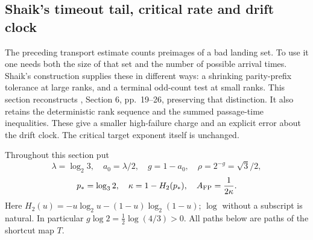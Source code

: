 \subsection{Shaik's timeout tail, critical rate and drift clock}
\label{sec:Shaik-timeout}
The preceding transport estimate counts preimages of a bad landing set.
To use it one needs both the size of that set and the number of possible
arrival times. Shaik's construction supplies these in different ways:
a shrinking parity-prefix tolerance at large ranks, and a terminal
odd-count test at small ranks. This section reconstructs
\cite{Shaik2026v324}, Section 6, pp.~19--26, preserving that distinction.
It also retains the deterministic rank sequence and the summed
passage-time inequalities. These give a smaller high-failure charge and
an explicit error about the drift clock. The critical target exponent
itself is unchanged.

Throughout this section put
\[
 \lambda=\log_2 3,\quad a_0=\lambda/2,\quad
 g=1-a_0,\quad \rho=2^{-g}=\sqrt3/2,
\]
\[
 p_*=\log_3 2,\quad \kappa=1-H_2(p_*),\quad
 A_{\rm FP}=\frac1{2\kappa}.
\]
Here \(H_2(u)=-u\log_2u-(1-u)\log_2(1-u)\);
\(\log\) without a subscript is natural. In particular
\(g\log2=\frac12\log(4/3)>0\).
All paths below are paths of the shortcut map \(T\).

